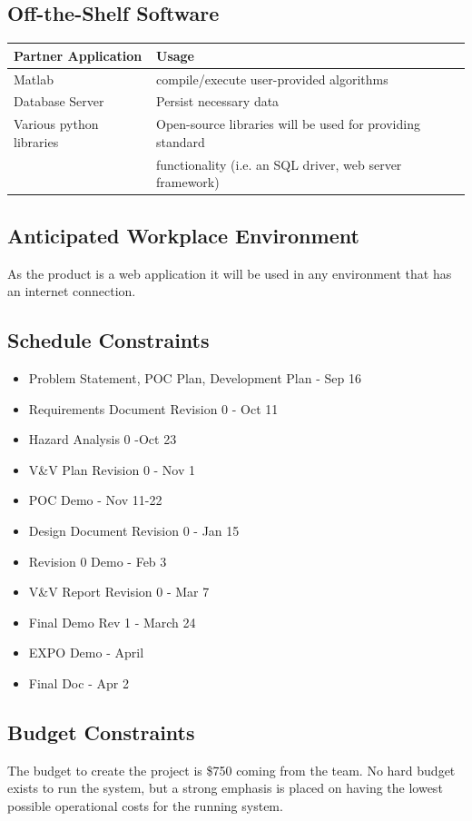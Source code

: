 \documentclass[12pt]{article}
\begin{document}
\subsection{Off-the-Shelf Software}

\begin{table}[H]
    \centering
    \begin{tabular}{|l|l|}
         \hline \textbf{Partner Application} & \textbf{Usage} \\
         \hline Matlab & compile/execute user-provided algorithms \\
         \hline Database Server & Persist necessary data \\
         \hline Various python libraries & Open-source libraries will be used for providing standard \\
         & functionality (i.e. an SQL driver, web server framework)\\
         \hline
    \end{tabular}
\end{table}
\subsection{Anticipated Workplace Environment}
As the product is a web application it will be used in any environment that has an internet connection. 
\subsection{Schedule Constraints}
\begin{itemize}
    \item Problem Statement, POC Plan, Development Plan - Sep 16
    \item Requirements Document Revision 0 - Oct 11
    \item Hazard Analysis 0 -Oct 23
    \item V\&V Plan Revision 0 - Nov 1
    \item POC Demo - Nov 11-22
    \item Design Document Revision 0 - Jan 15
    \item Revision 0 Demo - Feb 3
    \item V\&V Report Revision 0 - Mar 7
    \item Final Demo Rev 1 - March 24
    \item EXPO Demo - April
    \item Final Doc - Apr 2
\end{itemize}
\subsection{Budget Constraints}
The budget to create the project is \$750 coming from the team. No hard budget exists to run the system, but a strong emphasis is placed on having the lowest possible operational costs for the running system.
\end{document}

